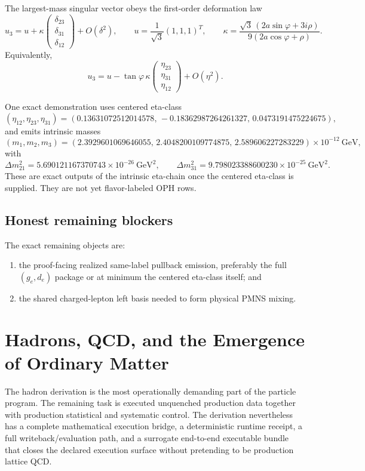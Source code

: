 \documentclass[11pt]{article}
\begin{document}
The largest-mass singular vector obeys the first-order deformation law
\[
u_3=
u+
\kappa
\begin{pmatrix}
\delta_{23}\\
\delta_{31}\\
\delta_{12}
\end{pmatrix}
+O(\delta^2),
\qquad
u=\frac1{\sqrt3}(1,1,1)^T,
\qquad
\kappa=
\frac{\sqrt3\,(2a\sin\varphi+3i\rho)}
     {9(2a\cos\varphi+\rho)}.
\]
Equivalently,
\[
u_3=
u-
\tan\varphi\,\kappa
\begin{pmatrix}
\eta_{23}\\
\eta_{31}\\
\eta_{12}
\end{pmatrix}
+O(\eta^2).
\]

One exact demonstration uses centered eta-class
\[
(\eta_{12},\eta_{23},\eta_{31})
=
(0.13631072512014578,\,-0.18362987264261327,\,0.0473191475224675),
\]
and emits intrinsic masses
\[
(m_1,m_2,m_3)=
(2.3929601069646055,\,
2.4048200109774875,\,
2.589606227283229)\times10^{-12}\ \mathrm{GeV},
\]
with
\[
\Delta m_{21}^2 = 5.690121167370743\times10^{-26}\ \mathrm{GeV}^2,
\qquad
\Delta m_{31}^2 = 9.798023388600230\times10^{-25}\ \mathrm{GeV}^2.
\]
These are exact outputs of the intrinsic eta-chain once the centered eta-class is supplied. They
are not yet flavor-labeled OPH rows.

\subsection{Honest remaining blockers}

The exact remaining objects are:
\begin{enumerate}
\item the proof-facing realized same-label pullback emission, preferably the full
\((g_e,d_e)\) package or at minimum the centered eta-class itself; and
\item the shared charged-lepton left basis needed to form physical PMNS mixing.
\end{enumerate}

\section{Hadrons, QCD, and the Emergence of Ordinary Matter}

The hadron derivation is the most operationally demanding part of the particle program. The
remaining task is executed unquenched production data together with production statistical and
systematic control. The derivation nevertheless has a complete
mathematical execution bridge, a deterministic runtime receipt, a full writeback/evaluation path,
and a surrogate end-to-end executable bundle that closes the declared execution surface without
pretending to be production lattice QCD.
\end{document}
